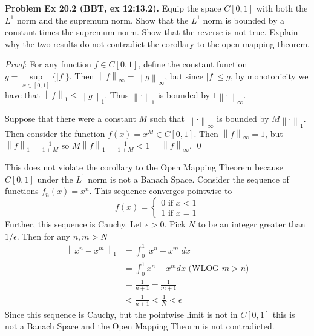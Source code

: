 \documentclass[12pt]{article}
\newcommand{\problem}[1]{\hspace{-4 ex} \large \textbf{Problem #1} }
\newcommand{\norm}[1]{\left\lVert#1\right\rVert}
\renewenvironment{proof}{\hspace{-4 ex} \emph{Proof}:}{\qed}
\begin{document}
\bigbreak
\problem{Ex 20.2 (BBT, ex 12:13.2).} Equip the space $C[0,1]$ with both the $L^1$ norm and the supremum norm. Show that the $L^1$ norm is bounded by a constant times the supremum norm. Show that the reverse is not true. Explain why the two results do not contradict the corollary to the open mapping theorem. \bigbreak

	\begin{proof}
		For any function $f \in C[0,1]$, define the constant function $g = \sup\limits_{x \in [0,1]}\{\vert f \vert \}$. Then $\norm{f}_\infty = \norm{g}_\infty$, but since $\vert f \vert  \leq g$, by monotonicity we have that $\norm{f}_1 \leq \norm{g}_1$. Thus $\norm{\cdot}_1$ is bounded by $1\norm{\cdot}_\infty$. \bigbreak
		
		Suppose that there were a constant $M$ such that $\norm{\cdot}_\infty$ is bounded by $M\norm{\cdot}_1$. Then consider the function $f(x) = x^{M} \in C[0,1]$. Then $\norm{f}_\infty = 1$, but $\norm{f}_1 = \tfrac{1}{1+M}$ so $M \norm{f}_1 = \tfrac{1}{1+M} < 1 = \norm{f}_\infty$.
	\end{proof}
	
	This does not violate the corollary to the Open Mapping Theorem because $C[0,1]$ under the $L^1$ norm is not a Banach Space. Consider the sequence of functions $f_n(x) = x^n$. This sequence converges pointwise to 
	$$
	f(x) =
	\begin{cases}
		0 \text{\ \ if $x<1$}\\
		1 \text{\ \ if $x=1$}
	\end{cases}
	$$
	Further, this sequence is Cauchy. Let $\epsilon > 0$. Pick $N$ to be an integer greater than $1/\epsilon$. Then for any $n,m>N$
	\begin{align*}
		\norm{x^n - x^m}_1 & = \int_0^1\vert x^n - x^m \vert dx \\
		& = \int_0^1 x^n - x^m dx \text{\ \ \ (WLOG $m>n$)}\\
		& = \tfrac{1}{n+1} - \tfrac{1}{m+1} \\
		& < \tfrac{1}{n+1} < \tfrac{1}{N} < \epsilon
	\end{align*}
	Since this sequence is Cauchy, but the pointwise limit is not in $C[0,1]$ this is not a Banach Space and the Open Mapping Theorm is not contradicted. 
\end{document}
